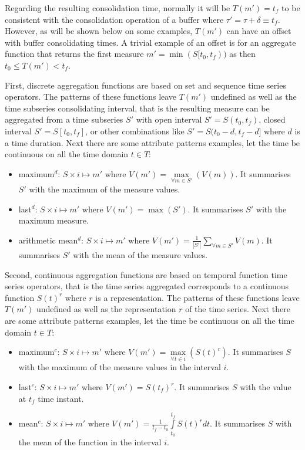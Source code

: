 Regarding the resulting consolidation time, normally it will be
$T(m')=t_f$ to be consistent with the consolidation operation of a
buffer where $\tau' = \tau + \delta \equiv t_f$. However, as will be
shown below on some examples, $T(m')$ can have an offset with buffer
consolidating times. A trivial example of an offset is for an
aggregate function that returns the first measure
$m'=\min(S[t_0,t_f))$ as then $t_0 \leq T(m') < t_f$.


First, discrete aggregation functions are based on set and sequence
time series operators. The patterns of these functions leave $T(m')$
undefined as well as the time subseries consolidating interval, that
is the resulting measure can be aggregated from a time subseries $S'$
with open interval $S'=S(t_0,t_f)$, closed interval $S'=S[t_0,t_f]$,
or other combinations like $S'=S(t_0-d,t_f-d]$ where $d$ is a time
duration. Next there are some attribute patterns examples, let the
time be continuous on all the time domain $t\in T$:
\begin{itemize}
\item maximum$^d$: $S \times i \mapsto m'$ where $V(m') =
  \max\limits_{\forall m \in S'}(V(m))$. It summarises $S'$ with the maximum
  of the measure values.
\item last$^d$: $S \times i \mapsto m'$ where $V(m') = \max(S')$. It
  summarises $S'$ with the maximum measure.
\item arithmetic mean$^d$: $S \times i \mapsto m'$ where $V(m') = 
  \frac{1}{|S'|} \allowbreak \sum\limits_{\forall m\in S'} V(m)$. It
  summarises $S'$ with the mean of the measure values.
\end{itemize}


Second, continuous aggregation functions are based on temporal
function time series operators, that is the time series aggregated
corresponds to a continuous function $S(t)^r$ where $r$ is a
representation. The patterns of these functions leave $T(m')$
undefined as well as the representation $r$ of the time series.  Next
there are some attribute patterns examples, let the time be continuous
on all the time domain $t\in T$:

\begin{itemize}
\item maximum$^c$: $S \times i \mapsto m'$ where $V(m') =
  \max\limits_{\forall t \in i}(S(t)^r)$. It summarises $S$ with the maximum
  of the measure values in the interval $i$.
\item last$^c$: $S \times i \mapsto m'$ where $V(m') = S(t_f)^r$. It
  summarises $S$ with the value at $t_f$ time instant.
\item mean$^c$: $S \times i \mapsto m'$ where $V(m') =
  \frac{1}{t_f-t_0} \int\limits_{t_0}^{t_f} S(t)^r dt$. It summarises $S$
  with the mean of the function in the interval $i$.
\end{itemize}


